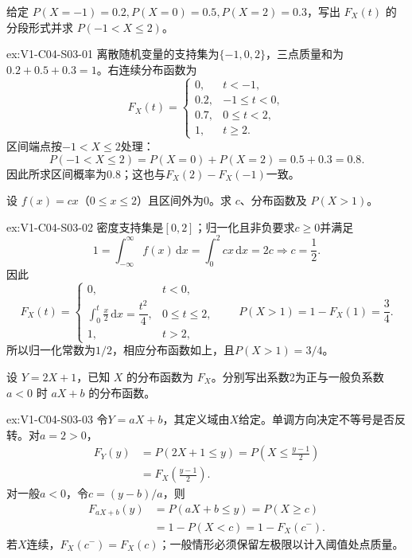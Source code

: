 \begin{SLChapterExercisePairSection}
\begin{exercise}\label{ex:V1-C04-S03-01}
给定 $P(X=-1)=0.2,P(X=0)=0.5,P(X=2)=0.3$，写出 $F_X(t)$ 的分段形式并求 $P(-1<X\le2)$。
\end{exercise}
\label{sol:V1-C04-S03-01}
\begin{chapterexercisesolution}{ex:V1-C04-S03-01}
离散随机变量的支持集为$\{-1,0,2\}$，三点质量和为$0.2+0.5+0.3=1$。右连续分布函数为
\[
F_X(t)=
\begin{cases}
0,&t<-1,\\
0.2,&-1\le t<0,\\
0.7,&0\le t<2,\\
1,&t\ge2.
\end{cases}
\]
区间端点按$-1<X\le2$处理：
\[
P(-1<X\le2)=P(X=0)+P(X=2)=0.5+0.3=0.8.
\]
因此所求区间概率为$0.8$；这也与$F_X(2)-F_X(-1)$一致。
\end{chapterexercisesolution}

\begin{exercise}\label{ex:V1-C04-S03-02}
设 $f(x)=c x$（$0\le x\le2$）且区间外为0。求 $c$、分布函数及 $P(X>1)$。
\end{exercise}
\label{sol:V1-C04-S03-02}
\begin{chapterexercisesolution}{ex:V1-C04-S03-02}
密度支持集是$[0,2]$；归一化且非负要求$c\ge0$并满足
\[
1=\int_{-\infty}^{\infty}f(x)\,\mathrm dx
=\int_0^2cx\,\mathrm dx=2c
\Longrightarrow c=\frac12.
\]
因此
\[
F_X(t)=
\begin{cases}
0,&t<0,\\
\displaystyle\int_0^t\frac{x}{2}\,\mathrm dx=\dfrac{t^2}{4},&0\le t\le2,\\
1,&t>2,
\end{cases}
\qquad
P(X>1)=1-F_X(1)=\frac34.
\]
所以归一化常数为$1/2$，相应分布函数如上，且$P(X>1)=3/4$。
\end{chapterexercisesolution}

\begin{exercise}\label{ex:V1-C04-S03-03}
设 $Y=2X+1$，已知 $X$ 的分布函数为 $F_X$。分别写出系数2为正与一般负系数 $a<0$ 时 $aX+b$ 的分布函数。
\end{exercise}
\label{sol:V1-C04-S03-03}
\begin{chapterexercisesolution}{ex:V1-C04-S03-03}
令$Y=aX+b$，其定义域由$X$给定。单调方向决定不等号是否反转。对$a=2>0$，
\[
\begin{aligned}
F_Y(y)&=P(2X+1\le y)
=P\left(X\le\frac{y-1}{2}\right)\\
&=F_X\left(\frac{y-1}{2}\right).
\end{aligned}
\]
对一般$a<0$，令$c=(y-b)/a$，则
\[
\begin{aligned}
F_{aX+b}(y)&=P(aX+b\le y)=P(X\ge c)\\
&=1-P(X<c)=1-F_X(c^-).
\end{aligned}
\]
若$X$连续，$F_X(c^-)=F_X(c)$；一般情形必须保留左极限以计入阈值处点质量。
\end{chapterexercisesolution}


\end{SLChapterExercisePairSection}
